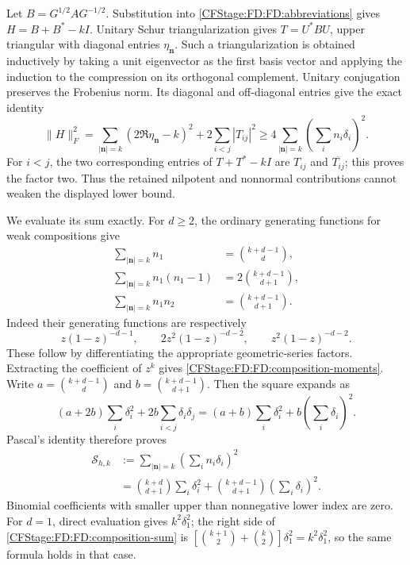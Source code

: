 Let \(B=G^{1/2}AG^{-1/2}\).  Substitution into
\eqref{CFStage:FD:FD:abbreviations} gives \(H=B+B^*-kI\).
Unitary Schur triangularization gives \(T=U^*BU\), upper triangular
with diagonal entries \(\eta_{\mathbf n}\).  Such a triangularization
is obtained inductively by taking a unit eigenvector as the first basis
vector and applying the induction to the compression on its orthogonal
complement.  Unitary conjugation preserves the Frobenius norm.  Its
diagonal and off-diagonal entries give the exact identity
\begin{equation}
\|H\|_F^2
=\sum_{|\mathbf n|=k}(2\Re\eta_{\mathbf n}-k)^2
+2\sum_{i<j}|T_{ij}|^2
\ge4\sum_{|\mathbf n|=k}\left(\sum_i n_i\delta_i\right)^2.
\tag{FD.31}\label{CFStage:FD:FD:Schur-exact}
\end{equation}
For \(i<j\), the two corresponding entries of \(T+T^*-kI\) are
\(T_{ij}\) and \(\overline{T_{ij}}\); this proves the factor two.
Thus the retained nilpotent and nonnormal contributions cannot weaken
the displayed lower bound.

We evaluate its sum exactly.  For \(d\ge2\), the ordinary generating
functions for weak compositions give
\begin{equation}
\begin{aligned}
\sum_{|\mathbf n|=k}n_1&=\binom{k+d-1}{d},\\
\sum_{|\mathbf n|=k}n_1(n_1-1)&=2\binom{k+d-1}{d+1},\\
\sum_{|\mathbf n|=k}n_1n_2&=\binom{k+d-1}{d+1}.
\end{aligned}
\tag{FD.32}\label{CFStage:FD:FD:composition-moments}
\end{equation}
Indeed their generating functions are respectively
\[
z(1-z)^{-d-1},\qquad
2z^2(1-z)^{-d-2},\qquad
z^2(1-z)^{-d-2}.
\]
These follow by differentiating the appropriate geometric-series
factors.  Extracting the coefficient of \(z^k\)
gives \eqref{CFStage:FD:FD:composition-moments}.  Write
\(a=\binom{k+d-1}{d}\) and \(b=\binom{k+d-1}{d+1}\).
Then the square expands as
\[
(a+2b)\sum_i\delta_i^2+2b\sum_{i<j}\delta_i\delta_j
=(a+b)\sum_i\delta_i^2+b\left(\sum_i\delta_i\right)^2.
\]
Pascal's identity therefore proves
\begin{equation}
\begin{aligned}
\mathcal S_{h,k}
&:=\sum_{|\mathbf n|=k}\left(\sum_i n_i\delta_i\right)^2\\
&=\binom{k+d}{d+1}\sum_i\delta_i^2
+\binom{k+d-1}{d+1}\left(\sum_i\delta_i\right)^2.
\end{aligned}
\tag{FD.33}\label{CFStage:FD:FD:composition-sum}
\end{equation}
Binomial coefficients with smaller upper than nonnegative lower index
are zero.  For \(d=1\), direct evaluation gives \(k^2\delta_1^2\);
the right side of \eqref{CFStage:FD:FD:composition-sum} is
\([\binom{k+1}{2}+\binom{k}{2}]\delta_1^2=k^2\delta_1^2\), so the
same formula holds in that case.

